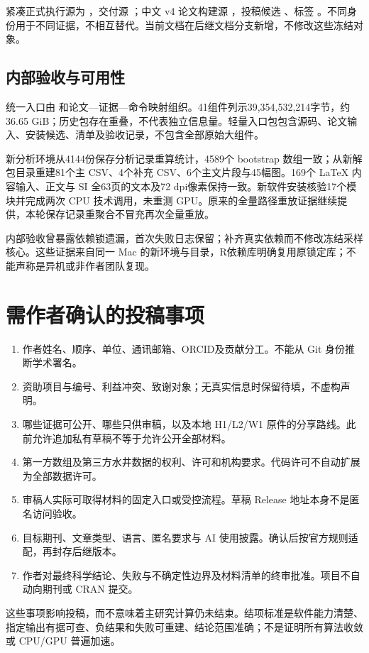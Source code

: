 \documentclass[UTF8,zihao=-4,a4paper,fontset=fandol]{ctexart}
\begin{document}
紧凑正式执行源为 ，交付源 ；中文 v4 论文构建源 ，投稿候选 、标签 。不同身份用于不同证据，不相互替代。当前文档在后继文档分支新增，不修改这些冻结对象。

\subsection{内部验收与可用性}
统一入口由  和论文—证据—命令映射组织。41组件列示39,354,532,214字节，约36.65 GiB；历史包存在重叠，不代表独立信息量。轻量入口包包含源码、论文输入、安装候选、清单及验收记录，不包含全部原始大组件。

新分析环境从4144份保存分析记录重算统计，4589个 bootstrap 数组一致；从新解包目录重建81个主 CSV、4个补充 CSV、6个主文片段与45幅图。169个 LaTeX 内容输入、正文与 SI 全63页的文本及72 dpi像素保持一致。新软件安装核验17个模块并完成两次 CPU 技术调用，未重测 GPU。原来的全量路径重放证据继续提供，本轮保存记录重聚合不冒充再次全量重放。

内部验收曾暴露依赖锁遗漏，首次失败日志保留；补齐真实依赖而不修改冻结采样核心。这些证据来自同一 Mac 的新环境与目录，R依赖库明确复用原锁定库；不能声称是异机或非作者团队复现。

\section{需作者确认的投稿事项}
\begin{enumerate}
\item 作者姓名、顺序、单位、通讯邮箱、ORCID及贡献分工。不能从 Git 身份推断学术署名。
\item 资助项目与编号、利益冲突、致谢对象；无真实信息时保留待填，不虚构声明。
\item 哪些证据可公开、哪些只供审稿，以及本地 H1/L2/W1 原件的分享路线。此前允许追加私有草稿不等于允许公开全部材料。
\item 第一方数组及第三方水井数据的权利、许可和机构要求。代码许可不自动扩展为全部数据许可。
\item 审稿人实际可取得材料的固定入口或受控流程。草稿 Release 地址本身不是匿名访问验收。
\item 目标期刊、文章类型、语言、匿名要求与 AI 使用披露。确认后按官方规则适配，再封存后继版本。
\item 作者对最终科学结论、失败与不确定性边界及材料清单的终审批准。项目不自动向期刊或 CRAN 提交。
\end{enumerate}

这些事项影响投稿，而不意味着主研究计算仍未结束。结项标准是软件能力清楚、指定输出有据可查、负结果和失败可重建、结论范围准确；不是证明所有算法收敛或 CPU/GPU 普遍加速。

\clearpage
\end{document}
